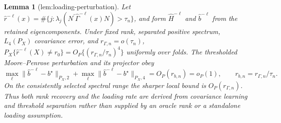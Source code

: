 \documentclass{article}
\newtheorem{lemma}{Lemma}
\begin{document}
\begin{lemma}[lem:loading-perturbation]\label{lem:loading-perturbation}
Let \(\widehat r^{-\ell}(x)=\#\{j:\lambda_j(N^{\prime}\widehat\Gamma^{-\ell}(x)N)>\tau_n\}\), and form \(\widehat H^{-\ell}\) and \(\widehat b^{-\ell}\) from the retained eigencomponents. Under fixed rank, separated positive spectrum, \(L_4(P_X)\) covariance error, and \(r_{\Gamma,n}=o(\tau_n)\), \(P_X\{\widehat r^{-\ell}(X)\ne r_0\}=O_P\{(r_{\Gamma,n}/\tau_n)^4\}\) uniformly over folds. The thresholded Moore--Penrose perturbation and its projector obey \[\max_{\ell}\|\widehat b^{-\ell}-b^{\star}\|_{P_X,2}+\max_{\ell}\|\widehat b^{-\ell}-b^{\star}\|_{P_X,4}=O_P(r_{b,n})=o_P(1),\qquad r_{b,n}=r_{\Gamma,n}/\tau_n.\] On the consistently selected spectral range the sharper local bound is \(O_P(r_{\Gamma,n})\). Thus both rank recovery and the loading rate are derived from covariance learning and threshold separation rather than supplied by an oracle rank or a standalone loading assumption.
\end{lemma}
\end{document}

